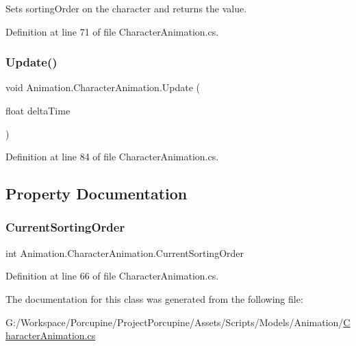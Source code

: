 Sets sorting\+Order on the character and returns the value. 



Definition at line 71 of file Character\+Animation.\+cs.

\mbox{\label{class_animation_1_1_character_animation_aa6b8e1d5d24188d204a651fea6791421}} 
\subsubsection{\texorpdfstring{Update()}{Update()}}
{\footnotesize\ttfamily void Animation.\+Character\+Animation.\+Update (\begin{DoxyParamCaption}\item[{float}]{delta\+Time }\end{DoxyParamCaption})}



Definition at line 84 of file Character\+Animation.\+cs.



\subsection{Property Documentation}
\mbox{\label{class_animation_1_1_character_animation_ada87b0cf3007bcc24ae26a01392c15b8}} 
\subsubsection{\texorpdfstring{Current\+Sorting\+Order}{CurrentSortingOrder}}
{\footnotesize\ttfamily int Animation.\+Character\+Animation.\+Current\+Sorting\+Order\hspace{0.3cm}{\ttfamily [get]}}



Definition at line 66 of file Character\+Animation.\+cs.



The documentation for this class was generated from the following file\+:\begin{DoxyCompactItemize}
\item 
G\+:/\+Workspace/\+Porcupine/\+Project\+Porcupine/\+Assets/\+Scripts/\+Models/\+Animation/\hyperlink{_character_animation_8cs}{Character\+Animation.\+cs}\end{DoxyCompactItemize}
